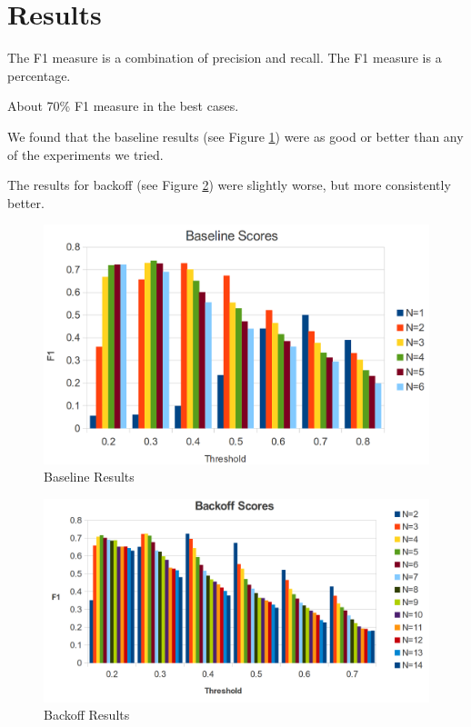 \documentclass{article}
\begin{document}
\section{Results}
The F1 measure is a combination of precision and recall. The F1 measure is a percentage. 

About 70\% F1 measure in the best cases.

We found that the baseline results (see Figure \ref{baseline}) were as good or better than any of the experiments we tried.

The results for backoff (see Figure \ref{backoff}) were slightly worse, but more consistently better.

\begin{figure}
\begin{center}
\includegraphics[scale=0.17]{baselinescores.png}
\end{center}
\caption{Baseline Results}
\label{baseline}
\end{figure}


\begin{figure}
\begin{center}
\includegraphics[scale=0.17]{backoff.png}
\end{center}
\caption{Backoff Results}
\label{backoff}
\end{figure}
\end{document}
